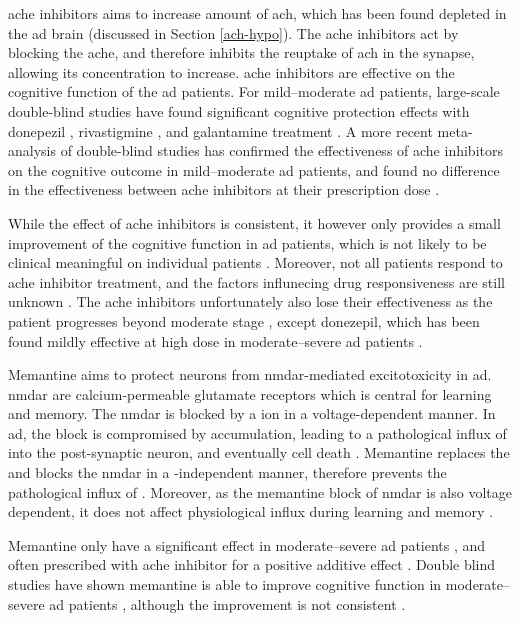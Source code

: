 \Gls{ache} inhibitors aims to increase amount of \gls{ach}, which has been found depleted in the \gls{ad} brain (discussed in Section \ref{ach-hypo}). The \gls{ache} inhibitors act by blocking the \gls{ache}, and therefore inhibits the reuptake of \gls{ach} in the synapse, allowing its concentration to increase. \Gls{ache} inhibitors are effective on the cognitive function of the \gls{ad} patients. For mild--moderate \gls{ad} patients, large-scale double-blind studies have found significant cognitive protection effects with donepezil \citep{rogers98}, rivastigmine \citep{farlow00}, and galantamine treatment \citep{wilkinson01}. A more recent meta-analysis of double-blind studies has confirmed the effectiveness of \gls{ache} inhibitors on the cognitive outcome in mild--moderate \gls{ad} patients, and found no difference in the effectiveness between \gls{ache} inhibitors at their prescription dose \citep{tan14}.

While the effect of \gls{ache} inhibitors is consistent, it however only provides a small improvement of the cognitive function in \gls{ad} patients, which is not likely to be clinical meaningful on individual patients \citep{lin13}. Moreover, not all patients respond to \gls{ache} inhibitor treatment, and the factors influnecing drug responsiveness are still unknown \citep{vanderputt06}. The \gls{ache} inhibitors unfortunately also lose their effectiveness as the patient progresses beyond moderate stage \citep{gillette-guyonnet11}, except donezepil, which has been found mildly effective at high dose in moderate--severe \gls{ad} patients \citep{sabbagh13}. 

Memantine aims to protect neurons from \gls{nmdar}-mediated excitotoxicity in \gls{ad}. \Gls{nmdar} are calcium-permeable glutamate receptors which is central for learning and memory. The \Gls{nmdar} is blocked by a  ion in a voltage-dependent manner. In \gls{ad}, the  block is compromised by \abeta{} accumulation, leading to a pathological influx of  into the post-synaptic neuron, and eventually cell death \citep{danysz12}. Memantine replaces the  and blocks the \gls{nmdar} in a \abeta{}-independent manner, therefore prevents the pathological influx of . Moreover, as the memantine block of \gls{nmdar} is also voltage dependent, it does not affect physiological  influx during learning and memory \citep{danysz12}.

Memantine only have a significant effect in moderate--severe \gls{ad} patients \citep{reisberg03, tariot04, schneider11}, and often prescribed with \gls{ache} inhibitor for a positive additive effect \citep{rountree09}. Double blind studies have shown memantine is able to improve cognitive function in moderate--severe \gls{ad} patients \citep{reisberg03, tariot04}, although the improvement is not consistent \citep{porsteinsson08}. 

